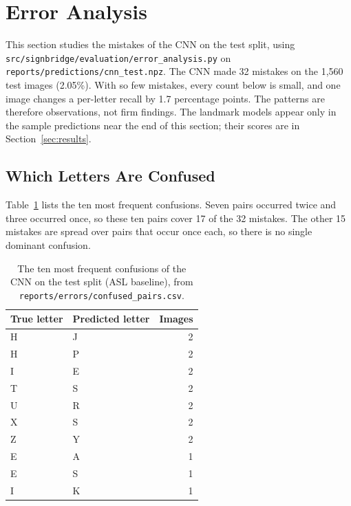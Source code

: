 \section{Error Analysis}
\label{sec:error-analysis}

This section studies the mistakes of the CNN on the test split, using \texttt{src/signbridge/\allowbreak evaluation/\allowbreak error\_analysis.py} on \texttt{reports/predictions/\allowbreak cnn\_test.npz}. The CNN made 32 mistakes on the 1{,}560 test images (2.05\%). With so few mistakes, every count below is small, and one image changes a per-letter recall by 1.7 percentage points. The patterns are therefore observations, not firm findings. The landmark models appear only in the sample predictions near the end of this section; their scores are in Section~\ref{sec:results}.

\subsection{Which Letters Are Confused}

Table~\ref{tab:confused-pairs} lists the ten most frequent confusions. Seven pairs occurred twice and three occurred once, so these ten pairs cover 17 of the 32 mistakes. The other 15 mistakes are spread over pairs that occur once each, so there is no single dominant confusion.

\begin{table}[htbp]
  \centering
  \caption{The ten most frequent confusions of the CNN on the test split (ASL baseline), from \texttt{reports/errors/confused\_pairs.csv}.}
  \label{tab:confused-pairs}
  \begin{tabular}{llr}
    \toprule
    True letter & Predicted letter & Images \\
    \midrule
    H & J & 2 \\
    H & P & 2 \\
    I & E & 2 \\
    T & S & 2 \\
    U & R & 2 \\
    X & S & 2 \\
    Z & Y & 2 \\
    E & A & 1 \\
    E & S & 1 \\
    I & K & 1 \\
    \bottomrule
  \end{tabular}
\end{table}


